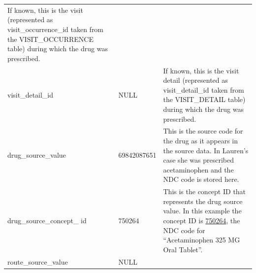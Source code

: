 \documentclass[11pt]{book}
\begin{document}
\begin{longtable}[]{@{}lll@{}}
\begin{minipage}[t]{0.48\columnwidth}
If known, this is the visit (represented as visit\_occurrence\_id taken
from the VISIT\_OCCURRENCE table) during which the drug was
prescribed.\strut
\end{minipage}\tabularnewline
\begin{minipage}[t]{0.28\columnwidth}\raggedright\strut
visit\_detail\_id\strut
\end{minipage} & \begin{minipage}[t]{0.16\columnwidth}\raggedright\strut
NULL\strut
\end{minipage} & \begin{minipage}[t]{0.48\columnwidth}\raggedright\strut
If known, this is the visit detail (represented as visit\_detail\_id
taken from the VISIT\_DETAIL table) during which the drug was
prescribed.\strut
\end{minipage}\tabularnewline
\begin{minipage}[t]{0.28\columnwidth}\raggedright\strut
drug\_source\_value\strut
\end{minipage} & \begin{minipage}[t]{0.16\columnwidth}\raggedright\strut
69842087651\strut
\end{minipage} & \begin{minipage}[t]{0.48\columnwidth}\raggedright\strut
This is the source code for the drug as it appears in the source data.
In Lauren's case she was prescribed acetaminophen and the NDC code is
stored here.\strut
\end{minipage}\tabularnewline
\begin{minipage}[t]{0.28\columnwidth}\raggedright\strut
drug\_source\_concept\_ id\strut
\end{minipage} & \begin{minipage}[t]{0.16\columnwidth}\raggedright\strut
750264\strut
\end{minipage} & \begin{minipage}[t]{0.48\columnwidth}\raggedright\strut
This is the concept ID that represents the drug source value. In this
example the concept ID is
\href{http://athena.ohdsi.org/search-terms/terms/750264}{750264}, the
NDC code for ``Acetaminophen 325 MG Oral Tablet''.\strut
\end{minipage}\tabularnewline
\begin{minipage}[t]{0.28\columnwidth}\raggedright\strut
route\_source\_value\strut
\end{minipage} & \begin{minipage}[t]{0.16\columnwidth}\raggedright\strut
NULL\strut
\end{minipage} & \begin{minipage}[t]{0.48\columnwidth}\raggedright\strut

\end{minipage}
\end{longtable}
\end{document}
